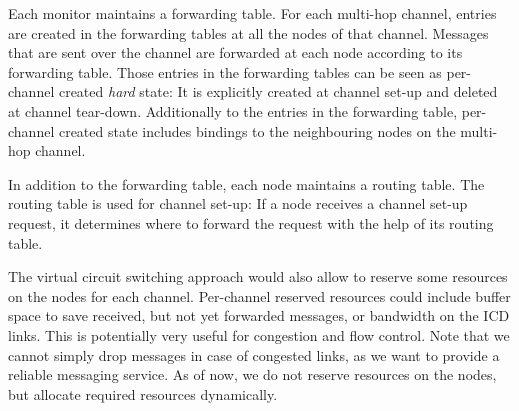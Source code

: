 \documentclass[a4paper,twoside]{report} %
\begin{document}
Each monitor maintains a forwarding table. For each multi-hop channel, entries are created in the forwarding tables at all the nodes of that channel. Messages that are sent over the channel are forwarded at each node according to its forwarding table. Those entries in the forwarding tables can be seen as per-channel created \emph{hard} state: It is explicitly created at channel set-up and deleted at channel tear-down. Additionally to the entries in the forwarding table, per-channel created state includes bindings to the neighbouring nodes on the multi-hop channel.  

In addition to the forwarding table, each node maintains a routing table. The routing table is used for channel set-up: If a node receives a channel set-up request, it determines where to forward the request with the help of its routing table. 

The virtual circuit switching approach would also allow to reserve some resources on the nodes for each channel. Per-channel reserved resources could include buffer space to save received, but not yet forwarded messages, or bandwidth on the ICD links. This is potentially very useful for congestion and flow control. Note that we cannot simply drop messages in case of congested links, as we want to provide a reliable messaging service. As of now, we do not reserve resources on the nodes, but allocate required resources dynamically.
\end{document}
